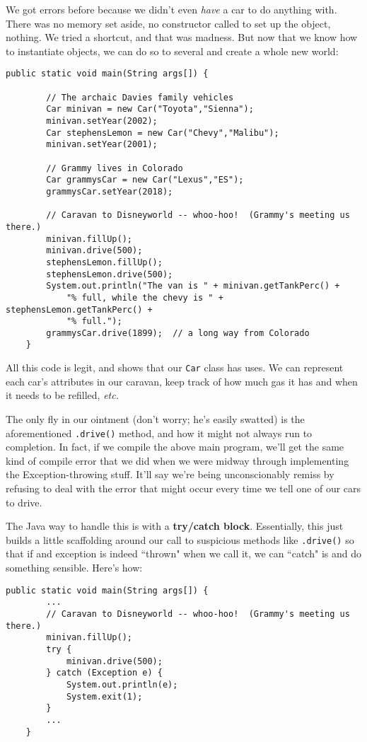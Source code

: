 We got errors before because we didn't even \textit{have} a car to do anything
with. There was no memory set aside, no constructor called to set up the
object, nothing. We tried a shortcut, and that was madness. But now that we
know how to instantiate objects, we can do so to several and create a whole
new world:

\begin{Verbatim}[samepage=true,fontsize=\footnotesize,frame=single]
    public static void main(String args[]) {

        // The archaic Davies family vehicles
        Car minivan = new Car("Toyota","Sienna");
        minivan.setYear(2002);
        Car stephensLemon = new Car("Chevy","Malibu");
        minivan.setYear(2001);

        // Grammy lives in Colorado
        Car grammysCar = new Car("Lexus","ES");
        grammysCar.setYear(2018);

        // Caravan to Disneyworld -- whoo-hoo!  (Grammy's meeting us there.)
        minivan.fillUp();
        minivan.drive(500);
        stephensLemon.fillUp();
        stephensLemon.drive(500);
        System.out.println("The van is " + minivan.getTankPerc() + 
            "% full, while the chevy is " + stephensLemon.getTankPerc() +
            "% full.");
        grammysCar.drive(1899);  // a long way from Colorado
    }
\end{Verbatim}

All this code is legit, and shows that our \texttt{Car} class has uses. We can
represent each car's attributes in our caravan, keep track of how much gas it
has and when it needs to be refilled, \textit{etc.}

The only fly in our ointment (don't worry; he's easily swatted) is the
aforementioned \texttt{.drive()} method, and how it might not always run to
completion. In fact, if we compile the above main program, we'll get the same
kind of compile error that we did when we were midway through implementing the
Exception-throwing stuff. It'll say we're being unconscionably remiss by
refusing to deal with the error that might occur every time we tell one of our
cars to drive.

The Java way to handle this is with a \textbf{try/catch block}. Essentially,
this just builds a little scaffolding around our call to suspicious methods
like \texttt{.drive()} so that if and exception is indeed ``thrown" when we
call it, we can ``catch" is and do something sensible. Here's how:

\begin{Verbatim}[samepage=true,fontsize=\scriptsize,frame=single]
    public static void main(String args[]) {
        ...
        // Caravan to Disneyworld -- whoo-hoo!  (Grammy's meeting us there.)
        minivan.fillUp();
        try {
            minivan.drive(500);
        } catch (Exception e) {
            System.out.println(e);
            System.exit(1);
        }
        ...
    }
\end{Verbatim}

